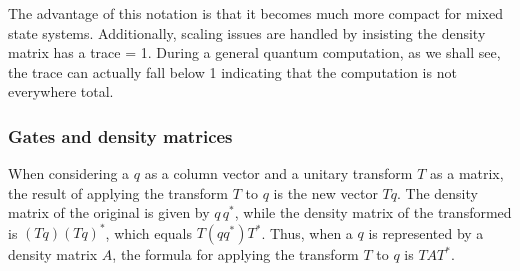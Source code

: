  The advantage of this notation is
that it becomes much more compact for mixed state systems. Additionally, 
scaling issues are handled by insisting the density matrix has a trace = 1.
During a general quantum computation, as we shall see,
the trace can actually fall below 1 indicating
that the computation is not everywhere total.

\subsubsection{Gates and density matrices}\label{app:subsubsecGatesAndDensityMatrices}
When considering  a \qbit{} $q$ as a column vector and
a unitary  transform $T$ as a matrix, the  result of applying the transform
$T$ to $q$ is the new vector $T q$. The
 density matrix of the original \qbit{} is given by $q\, q^{*}$, while 
the density matrix of the transformed \qbit{} is 
$(T q) ( T q)^{*}$, which equals $ T (q q^{*}) T^{*}$. Thus, when
a \qbit{} $q$ is represented by a density matrix $A$, the
formula for applying the transform $T$ to $q$ is $T A T^{*}$.

